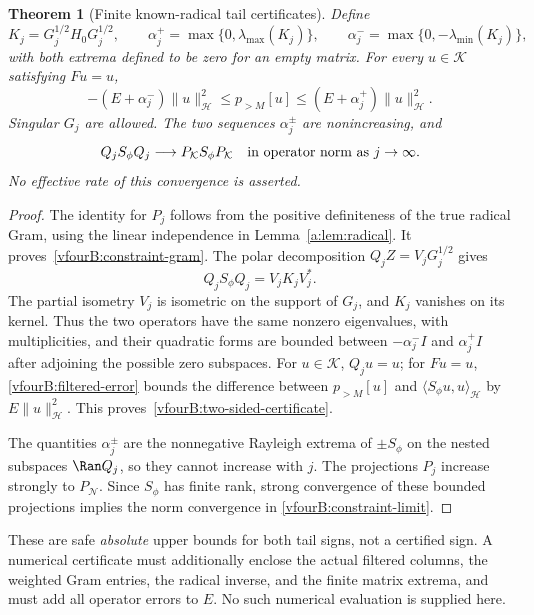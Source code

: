 \documentclass[11pt,a4paper]{article}
\numberwithin{equation}{section}
\newtheorem{theorem}{Theorem}[section]
\theoremstyle{definition}\newtheorem{definition}[theorem]{Definition}
\theoremstyle{remark}\newtheorem{remark}[theorem]{Remark}
\newcommand{\Hh}{\mathcal H}\newcommand{\Hw}{\mathcal H}
\newcommand{\ip}[2]{\langle#1,#2\rangle}\newcommand{\norm}[1]{\lVert#1\rVert}\newcommand{\abs}[1]{\lvert#1\rvert}
\newcommand{\Nn}{\mathcal N}\newcommand{\Ii}{\mathcal I}\newcommand{\Zz}{\mathcal Z}
\newcommand{\Kk}{\mathcal K}\newcommand{\Aa}{\mathcal A}\newcommand{\Ff}{\mathcal F}
\begin{document}
\begin{theorem}[Finite known-radical tail certificates]
\label{vfourB:gram-certificate}
Define
\[
 K_j=G_j^{1/2}H_0G_j^{1/2},\qquad
 \alpha_j^+=\max\{0,\lambda_{\max}(K_j)\},\qquad
 \alpha_j^-=\max\{0,-\lambda_{\min}(K_j)\},
\]
with both extrema defined to be zero for an empty matrix. For every
$u\in\Kk$ satisfying $Fu=u$,
\begin{equation}\label{vfourB:two-sided-certificate}
 -(E+\alpha_j^-)\norm u_{\Hh}^2
 \le p_{>M}[u]\le(E+\alpha_j^+)\norm u_{\Hh}^2.
\end{equation}
Singular $G_j$ are allowed. The two sequences $\alpha_j^\pm$ are
nonincreasing, and
\begin{equation}\label{vfourB:constraint-limit}
 Q_jS_\phi Q_j\longrightarrow P_\Kk S_\phi P_\Kk
 \quad\hbox{in operator norm as }j\to\infty.
\end{equation}
No effective rate of this convergence is asserted.
\end{theorem}
\begin{proof}
The identity for $P_j$ follows from the positive definiteness of the
true radical Gram, using the linear independence in
Lemma~\ref{a:lem:radical}. It proves~\eqref{vfourB:constraint-gram}.
The polar decomposition $Q_jZ=V_jG_j^{1/2}$ gives
\[
 Q_jS_\phi Q_j=V_jK_jV_j^*.
\]
The partial isometry $V_j$ is isometric on the support of $G_j$, and
$K_j$ vanishes on its kernel. Thus the two operators have the same
nonzero eigenvalues, with multiplicities, and their quadratic forms are
bounded between $-\alpha_j^-I$ and $\alpha_j^+I$ after adjoining the
possible zero subspaces. For $u\in\Kk$, $Q_ju=u$; for $Fu=u$,
\eqref{vfourB:filtered-error} bounds the difference between
$p_{>M}[u]$ and $\ip{S_\phi u}{u}_{\Hh}$ by $E\norm u_{\Hh}^2$.
This proves~\eqref{vfourB:two-sided-certificate}.

The quantities $\alpha_j^\pm$ are the nonnegative Rayleigh extrema of
$\pm S_\phi$ on the nested subspaces $\Ran Q_j$, so they cannot increase
with $j$. The projections $P_j$ increase strongly to $P_\Nn$.
Since $S_\phi$ has finite rank, strong convergence of these bounded
projections implies the norm convergence in
\eqref{vfourB:constraint-limit}.
\end{proof}

These are safe \emph{absolute} upper bounds for both tail signs, not a
certified sign. A numerical certificate must additionally enclose the
actual filtered columns, the weighted Gram entries, the radical inverse,
and the finite matrix extrema, and must add all operator errors to $E$.
No such numerical evaluation is supplied here.
\end{document}
